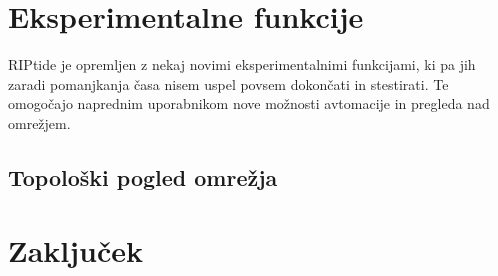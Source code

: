 \documentclass[12pt]{article}
\begin{document}
\section{Eksperimentalne funkcije}
RIPtide je opremljen z nekaj novimi eksperimentalnimi funkcijami,
ki pa jih zaradi pomanjkanja časa nisem uspel povsem dokončati in
stestirati. Te omogočajo naprednim uporabnikom nove možnosti avtomacije
in pregleda nad omrežjem.

\subsection{Topološki pogled omrežja}
\newpage

\section{Zaključek}
\newpage
\end{document}
